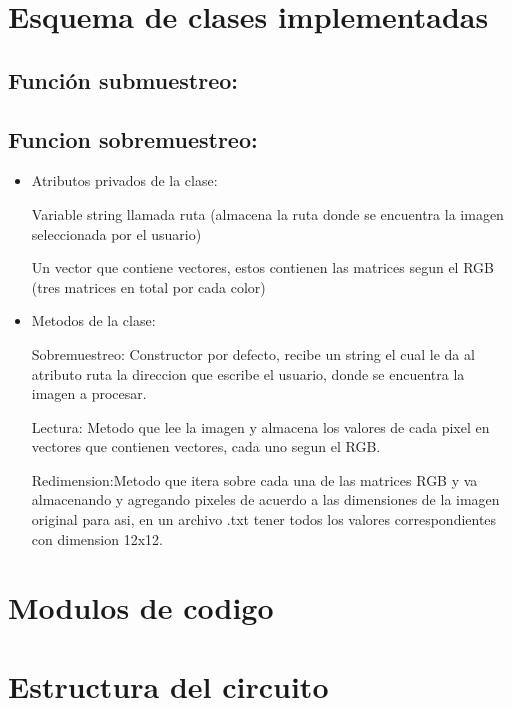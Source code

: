 \documentclass{article}
\begin{document}
\section{Esquema de clases implementadas}
\subsection{Función submuestreo: }

\subsection{Funcion sobremuestreo:}
\begin{itemize}
\item Atributos privados de la clase:

\hspace{0.5cm}Variable string llamada ruta (almacena la ruta donde se encuentra la imagen seleccionada por el usuario)

\hspace{0.5cm}Un vector que contiene vectores, estos contienen las matrices segun el RGB (tres matrices en total por cada color)

\item Metodos de la clase:

\hspace{0.5cm}Sobremuestreo: Constructor por defecto, recibe un string el cual le da al atributo ruta la direccion que escribe el usuario, donde se encuentra la imagen a procesar.

\hspace{0.5cm}Lectura: Metodo que lee la imagen y almacena los valores de cada pixel en vectores que contienen vectores, cada uno segun el RGB.

\hspace{0.5cm}Redimension:Metodo que itera sobre cada una de las matrices RGB y va almacenando y agregando pixeles de acuerdo a las dimensiones de la imagen original para asi, en un archivo .txt tener todos los valores correspondientes con dimension 12x12.


\end{itemize}

\section{Modulos de codigo}

\section{Estructura del circuito}
\end{document}

